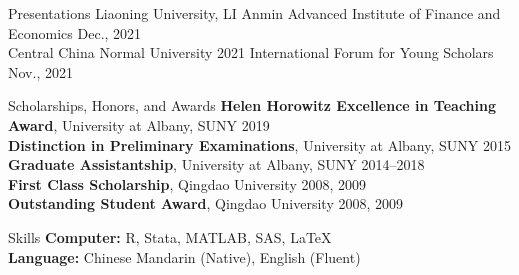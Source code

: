 \documentclass{resume_liang} %
\begin{document}
\begin{rSection}{Presentations} 
	{Liaoning University, LI Anmin Advanced Institute of Finance and Economics} \hfill{Dec., 2021}  
	\vspace{0.1cm}\\ 
	{Central China Normal University 2021 International Forum for Young Scholars} \hfill{Nov., 2021}  
	\vspace{0.1cm}
\end{rSection}
\bigskip  



\begin{rSection}{Scholarships, Honors, and Awards} 
{\bf Helen Horowitz Excellence in Teaching Award}{, University at Albany, SUNY} \hfill{2019}  \vspace{0.1cm}\\ 
{\bf Distinction in Preliminary Examinations}{, University at Albany, SUNY} \hfill{2015}  \vspace{0.1cm}\\
{\bf Graduate Assistantship}{, University at Albany, SUNY} \hfill{2014--2018}  
\vspace{0.1cm}\\
{\bf First Class Scholarship}{, Qingdao University} \hfill{2008, 2009} 
\vspace{0.1cm}\\
{\bf Outstanding Student Award}{, Qingdao University} \hfill{2008, 2009}  
\vspace{0.1cm}
\end{rSection}
\bigskip  




\begin{rSection}{Skills}
{\bf Computer:} R, Stata, MATLAB, SAS, LaTeX 
\vspace{0.1cm} \\
{\bf Language:} Chinese Mandarin (Native), English (Fluent) 
\end{rSection}
\bigskip  
\end{document}
